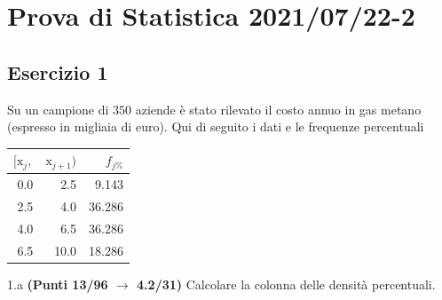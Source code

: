 \documentclass[
  11pt,
]{book}
\theoremstyle{mytheoremstyle}
\theoremstyle{mydefstyle}
\begin{document}
\section{Prova di Statistica 2021/07/22-2}\label{prova-di-statistica-20210722-2}

\subsection{Esercizio 1}\label{esercizio-1-8}

Su un campione di \(350\) aziende è stato rilevato il costo annuo in gas metano (espresso in migliaia di euro). Qui di seguito i dati e le frequenze percentuali

\begin{table}[H]
\centering
\begin{tabular}{rrr}
\toprule
$[\text{x}_j,$ & $\text{x}_{j+1})$ & $f_{j\%}$\\
\midrule
0.0 & 2.5 & 9.143\\
2.5 & 4.0 & 36.286\\
4.0 & 6.5 & 36.286\\
6.5 & 10.0 & 18.286\\
\bottomrule
\end{tabular}
\end{table}

1.a \textbf{(Punti 13/96 \(\rightarrow\) 4.2/31)} Calcolare la colonna delle densità percentuali.
\end{document}
